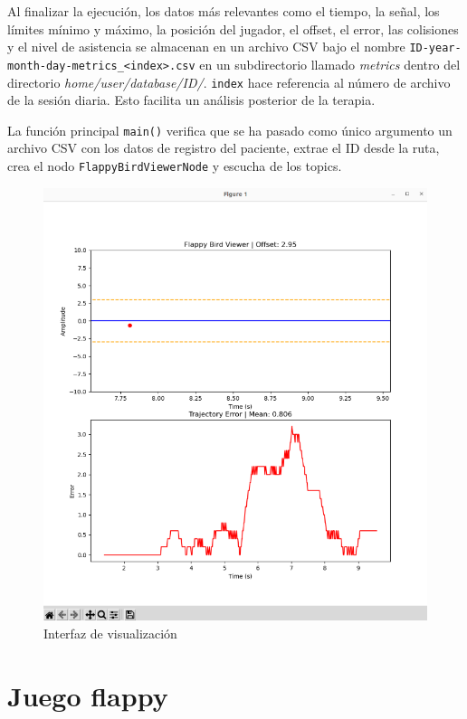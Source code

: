 Al finalizar la ejecución, los datos más relevantes como el tiempo, la señal, los límites mínimo y máximo, la posición del jugador, el offset, el error, las colisiones y el nivel de asistencia se almacenan en un archivo CSV bajo el nombre \verb|ID-year-month-day-metrics_<index>.csv| en un subdirectorio llamado \textit{metrics} dentro del directorio \textit{home/user/database/ID/}.
\verb|index| hace referencia al número de archivo de la sesión diaria.
Esto facilita un análisis posterior de la terapia.

La función principal \verb|main()| verifica que se ha pasado como único argumento un archivo CSV con los datos de registro del paciente, extrae el ID desde la ruta, crea el nodo \verb|FlappyBirdViewerNode| y escucha de los topics.

\begin{figure}[ht!]
	\centering
	\begin{minipage}{0.85\linewidth}
		\centering
		\includegraphics[width=\linewidth]{figs/visual.png}
	\end{minipage}
	\caption[Interfaz de visualización]{Interfaz de visualización}
	\label{fig:visual}
\end{figure}

\section{Juego flappy}
